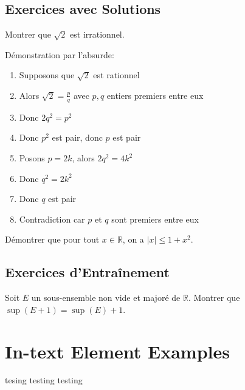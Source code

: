 \documentclass[11pt,%
	fleqn,%
	a4paper,%
	twoside%
]{backagBook}
\begin{document}
\section{Exercices avec Solutions}\label{sec:exercices-solutions}

\begin{exercise}
Montrer que $\sqrt{2}$ est irrationnel.
\end{exercise}

\begin{solution}
Démonstration par l'absurde:
\begin{enumerate}
    \item Supposons que $\sqrt{2}$ est rationnel
    \item Alors $\sqrt{2} = \frac{p}{q}$ avec $p,q$ entiers premiers entre eux
    \item Donc $2q^2 = p^2$
    \item Donc $p^2$ est pair, donc $p$ est pair
    \item Posons $p = 2k$, alors $2q^2 = 4k^2$
    \item Donc $q^2 = 2k^2$
    \item Donc $q$ est pair
    \item Contradiction car $p$ et $q$ sont premiers entre eux
\end{enumerate}
\end{solution}

\begin{exercise}
Démontrer que pour tout $x \in \mathbb{R}$, on a $|x| \leq 1 + x^2$.
\end{exercise}

\section{Exercices d'Entraînement}\label{sec:exercices-entrainement}

\begin{exercise}
Soit $E$ un sous-ensemble non vide et majoré de $\mathbb{R}$. Montrer que $\sup(E+1) = \sup(E) + 1$.
\end{exercise}


\chapter{In-text Element Examples}
tesing testing testing
\end{document}
